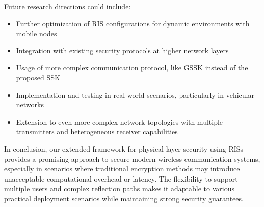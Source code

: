 Future research directions could include:
\begin{itemize}
  \item Further optimization of RIS configurations for dynamic environments with mobile nodes
  \item Integration with existing security protocols at higher network layers
  \item Usage of more complex communication protocol, like GSSK \cite{4699782} instead of the proposed SSK \cite{5165332}
  \item Implementation and testing in real-world scenarios, particularly in vehicular networks
  \item Extension to even more complex network topologies with multiple transmitters and heterogeneous receiver capabilities
\end{itemize}

In conclusion, our extended framework for physical layer security using RISs provides a promising approach to secure modern wireless communication systems, especially in scenarios where traditional encryption methods may introduce unacceptable computational overhead or latency. The flexibility to support multiple users and complex reflection paths makes it adaptable to various practical deployment scenarios while maintaining strong security guarantees.
